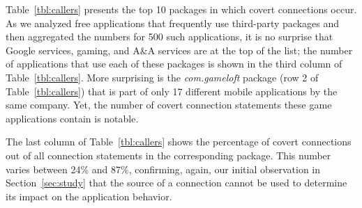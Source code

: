 Table~\ref{tbl:callers} presents the top 10 packages in which
covert connections occur. 
As we analyzed free applications that frequently use third-party packages and then aggregated the numbers for
500 such applications, it is no surprise that Google services, gaming, and A\&A services are at the top of the
list; the number of applications that use each of these packages is shown in the third
column of Table~\ref{tbl:callers}.
More surprising is the \emph{com.gameloft} package (row 2 of Table~\ref{tbl:callers}) that is part of only 17 different mobile applications by the same company. Yet, the number of covert connection statements these game applications contain is notable. 

The last column of Table~\ref{tbl:callers} shows the percentage of covert connections out of all connection statements in the corresponding package. This number varies between 24\% and 87\%, confirming, again, our initial observation in Section~\ref{sec:study} that the source of a connection cannot be used to determine its impact on the application behavior. 


 






